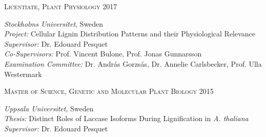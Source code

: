 \documentclass[11pt]{article}
\begin{document}
\textsc{\large{Licentiate, Plant Physiology} \hfill \textsc{2017}}
\begin{addmargin}[24pt]{0pt}
	\textit{Stockholms Universitet}, Sweden \\
	\textit{Project:} Cellular Lignin Distribution Patterns and their Physiological Relevance \\
	\textit{Supervisor:} Dr. Edouard Pesquet \\
	\textit{Co-Supervisors:} Prof. Vincent Bulone, Prof. Jonas Gunnarsson\\
	\textit{Examination Committee:} Dr. András Gorzsás, Dr. Annelie Carlsbecker, Prof. Ulla Westermark
	\vspace{0.1cm} \\
\end{addmargin}
\vspace{0.2cm}

\textsc{\large{Master of Science, Genetic and Molecular Plant Biology} \hfill \textsc{2015}}
\begin{addmargin}[24pt]{0pt}
	\textit{Uppsala Universitet}, Sweden \\
	\textit{Thesis:} Distinct Roles of Laccase Isoforms During Lignification in \textit{ A. thaliana}\\
	\textit{Supervisor:} Dr. Edouard Pesquet
	\vspace{0.1cm} \\
\end{addmargin}
\vspace{0.2cm}
\end{document}
